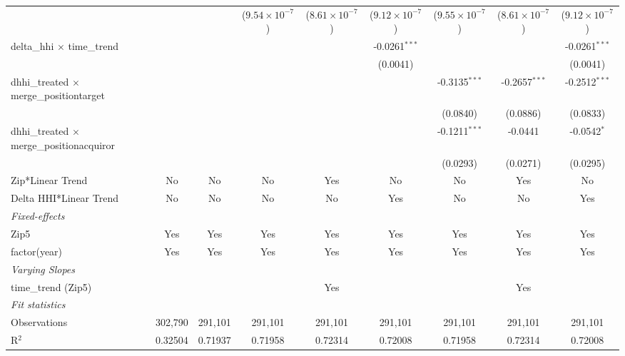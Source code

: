 \begin{table}[H]
{\begin{tabular}{lcccccccc}
   &   &    & ($9.54\times 10^{-7}$) & ($8.61\times 10^{-7}$) & ($9.12\times 10^{-7}$) & ($9.55\times 10^{-7}$) & ($8.61\times 10^{-7}$) & ($9.12\times 10^{-7}$)\\ 

 delta\_hhi $\times $ time\_trend&   &    &    &    & -0.0261$^{***}$ &    &    & -0.0261$^{***}$\\ 

   &   &    &    &    & (0.0041) &    &    & (0.0041)\\ 

 dhhi\_treated $\times $ merge\_positiontarget&   &    &    &    &    & -0.3135$^{***}$ & -0.2657$^{***}$ & -0.2512$^{***}$\\ 

   &   &    &    &    &    & (0.0840) & (0.0886) & (0.0833)\\ 

 dhhi\_treated $\times $ merge\_positionacquiror&   &    &    &    &    & -0.1211$^{***}$ & -0.0441 & -0.0542$^{*}$\\ 

   &   &    &    &    &    & (0.0293) & (0.0271) & (0.0295)\\ 

 Zip*Linear Trend & No & No & No & Yes & No & No & Yes & No\\ 

 Delta HHI*Linear Trend & No & No & No & No & Yes & No & No & Yes\\ 

 \midrule \emph{Fixed-effects}&   &   &   &   &   &   &   &  \\ 

 Zip5 & Yes & Yes & Yes & Yes & Yes & Yes & Yes & Yes\\ 

 factor(year) & Yes & Yes & Yes & Yes & Yes & Yes & Yes & Yes\\ 

 \midrule \emph{Varying Slopes}&   &   &   &   &   &   &   &  \\ 

 time\_trend (Zip5) &  &  &  & Yes &  &  & Yes & \\ 

 \midrule \emph{Fit statistics}&  & & & & & & & \\ 

 Observations & 302,790&291,101&291,101&291,101&291,101&291,101&291,101&291,101\\ 

 R$^2$ & 0.32504&0.71937&0.71958&0.72314&0.72008&0.71958&0.72314&0.72008\\ 


\end{tabular}}
\end{table}
